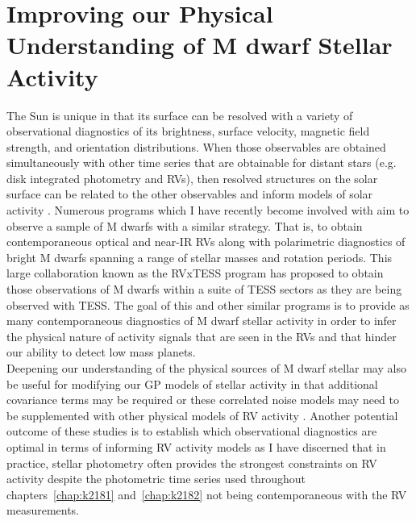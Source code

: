 \section{Improving our Physical Understanding of M dwarf Stellar Activity}
The Sun is unique in that its surface can be resolved with a variety of
observational diagnostics of its brightness, surface velocity, magnetic field strength,
and orientation distributions. When those observables are obtained
simultaneously with other time series that are obtainable for distant stars
(e.g. disk integrated photometry and RVs), then resolved structures on the solar
surface can be related to the other observables and inform models of solar
activity \citep{dumusque15,haywood16}. Numerous programs which I have recently
become involved with aim to observe a sample of M dwarfs with a similar
strategy. That is, to obtain contemporaneous optical and near-IR RVs along with
polarimetric diagnostics of bright M dwarfs spanning a range of stellar masses
and rotation periods. This large collaboration known as the RVxTESS program
has proposed to obtain those observations of M dwarfs within a suite of TESS
sectors as they are being observed with TESS. The goal of this and other
similar programs is to provide as many contemporaneous diagnostics of M dwarf
stellar activity in order to infer the physical nature of activity signals that
are seen in the RVs and that hinder our ability to detect low mass planets. \\

Deepening our understanding of the physical sources of M dwarf stellar may also
be useful for modifying our GP models of stellar activity in that additional
covariance terms may be required or these correlated noise models may need to
be supplemented with other physical models of RV activity
\citep[e.g.][]{aigrain12,haywood14}. Another potential
outcome of these studies is to establish which observational diagnostics
are optimal in terms of informing RV activity models as I have discerned that
in practice, stellar photometry often provides the strongest constraints on RV
activity despite the photometric time series used throughout
chapters~\ref{chap:k2181} and~\ref{chap:k2182} not being contemporaneous with
the RV measurements.


